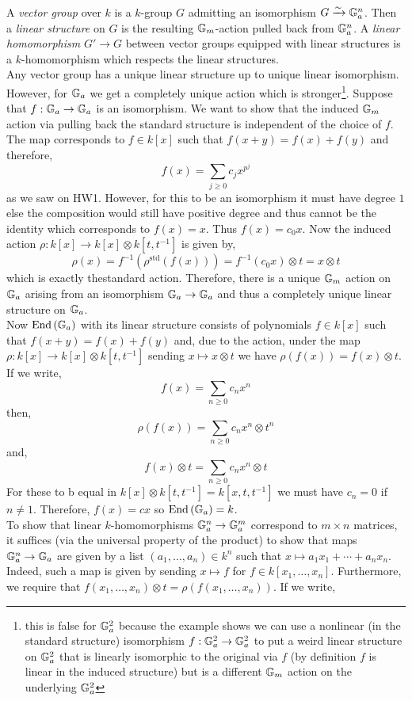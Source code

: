 \documentclass[12pt]{article}
\begin{document}
A \textit{vector group} over $k$ is a $k$-group $G$ admitting an isomorphism $G \xrightarrow{\sim} \mathbb{G}_a^n$. Then a \textit{linear structure} on $G$ is the resulting $\mathbb{G}_m$-action pulled back from $\mathbb{G}_a^n$. A \textit{linear homomorphism} $G' \to G$ between vector groups equipped with linear structures is a $k$-homomorphism which respects the linear structures.
\bigskip\\
Any vector group has a unique linear structure up to unique linear isomorphism. However, for $\mathbb{G}_a$ we get a completely unique action which is stronger\footnote{this is false for $\mathbb{G}_a^2$ because the example shows we can use a nonlinear (in the standard structure) isomorphism $f : \mathbb{G}_a^2 \to \mathbb{G}_a^2$ to put a weird linear structure on $\mathbb{G}_a^2$ that is linearly isomorphic to the original via $f$ (by definition $f$ is linear in the induced structure) but is a different $\mathbb{G}_m$ action on the underlying $\mathbb{G}_a^2$}.
Suppose that $f : \mathbb{G}_a \to \mathbb{G}_a$ is an isomorphism. We want to show that the induced $\mathbb{G}_m$ action via pulling back the standard structure is independent of the choice of $f$. The map corresponds to $f \in k[x]$ such that $f(x + y) = f(x) + f(y)$ and therefore,
\[ f(x) = \sum_{j \ge 0} c_j x^{p^j} \]
as we saw on HW1. However, for this to be an isomorphism it must have degree $1$ else the composition would still have positive degree and thus cannot be the identity which corresponds to $f(x) = x$. Thus $f(x) = c_0 x$. Now the induced action $\rho : k[x] \to k[x] \otimes k[t,t^{-1}]$ is given by,
\[ \rho(x) = f^{-1}(\rho^{\text{std}}(f(x))) = f^{-1}(c_0 x) \otimes t = x \otimes t \]
which is exactly thestandard action. Therefore, there is a unique $\mathbb{G}_m$ action on $\mathbb{G}_a$ arising from an isomorphism $\mathbb{G}_a \to \mathbb{G}_a$ and thus a completely unique linear structure on $\mathbb{G}_a$.
\bigskip\\
Now $\mathrm{End}\left( \mathbb{G}_a \right)$ with its linear structure consists of polynomials $f \in k[x]$ such that $f(x + y) = f(x) + f(y)$ and, due to the action, under the map $\rho : k[x] \to k[x] \otimes k[t,t^{-1}]$ sending $x \mapsto x \otimes t$ we have $\rho(f(x)) = f(x) \otimes t$. If we write,
\[ f(x) = \sum_{n \ge 0} c_n x^n \]
then,
\[ \rho(f(x)) = \sum_{n \ge 0} c_n x^n \otimes t^n \]
and,
\[ f(x) \otimes t = \sum_{n \ge 0} c_n x^n \otimes t \]
For these to b equal in $k[x] \otimes k[t,t^{-1}] = k[x,t,t^{-1}]$ we must have $c_n = 0$ if $n \neq 1$. Therefore, $f(x) = c x$ so $\mathrm{End}\left( \mathbb{G}_a \right) = k$. 
\bigskip\\
To show that linear $k$-homomorphisms $\mathbb{G}_a^n \to \mathbb{G}_a^m$ correspond to $m \times n$ matrices, it suffices (via the universal property of the product) to show that maps $\mathbb{G}_a^n \to \mathbb{G}_a$ are given by a list $(a_1, \dots, a_n) \in k^n$ such that $x \mapsto a_1 x_1 + \cdots + a_n x_n$. Indeed, such a map is given by sending $x \mapsto f$ for $f \in k[x_1, \dots, x_n]$. Furthermore, we require that $f(x_1, \dots, x_n) \otimes t = \rho(f(x_1, \dots, x_n))$. If we write,
\end{document}
